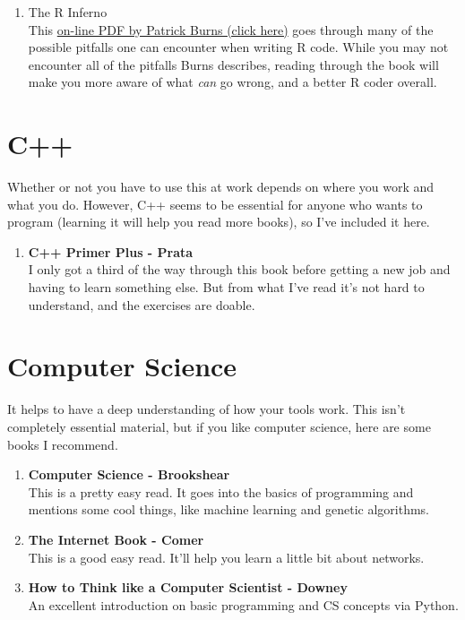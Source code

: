 \documentclass[oneside, titlepage]{article}
\begin{document}
\begin{enumerate}
\item{\bfserires The R Inferno}\\
This \href{http://www.burns-stat.com/pages/Tutor/R_inferno.pdf}{on-line PDF by Patrick Burns (click here)} goes through many of the possible pitfalls one can encounter when writing R code. While you may not encounter all of the pitfalls Burns describes, reading through the book will make you more aware of what \emph{can} go wrong, and a better R coder overall.

\end{enumerate}

\section{C++}
Whether or not you have to use this at work depends on where you work and what you do. However, C++ seems to be essential for anyone who wants to program (learning it will help you read more books), so I've included it here.

\begin{enumerate}
\item{\bfseries C++ Primer Plus - Prata}\\
I only got a third of the way through this book before getting a new job and having to learn something else. But from what I've read it's not hard to understand, and the exercises are doable.
\end{enumerate}

\section{Computer Science}
It helps to have a deep understanding of how your tools work. This isn't completely essential material, but if you like computer science, here are some books I recommend.

\begin{enumerate}
\item{\bfseries Computer Science - Brookshear}\\
This is a pretty easy read. It goes into the basics of programming and mentions some cool things, like machine learning and genetic algorithms.

\item{\bfseries The Internet Book - Comer}\\
This is a good easy read. It'll help you learn a little bit about networks.

\item{\bfseries How to Think like a Computer Scientist - Downey}\\
An excellent introduction on basic programming and CS concepts via Python.
\end{enumerate}
\end{document}

